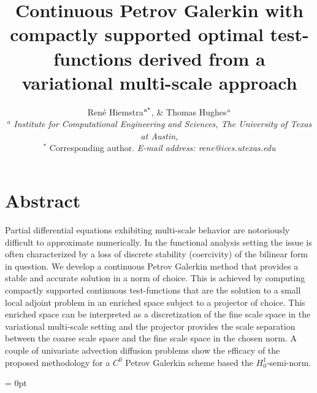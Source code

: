 \documentclass[12pt]{article}
\begin{document}
\title{Continuous Petrov Galerkin with compactly supported optimal test-functions derived from a variational multi-scale approach}

\author{Ren\'{e} Hiemstra$^{\textup{a*}}$, \& Thomas Hughes$^{\textup{a}}$ \\
$^a$ \textit{\small Institute for Computational Engineering and Sciences, The University of Texas at Austin,} \\
$^*$ \small Corresponding author.  \textit{E-mail address: rene@ices.utexas.edu}}

\date{}
\maketitle

\section*{Abstract} Partial differential equations exhibiting multi-scale behavior are notoriously difficult to approximate numerically. In the functional analysis setting the issue is often characterized by a loss of discrete stability (coercivity) of the bilinear form in question. We develop a continuous Petrov Galerkin method that provides a stable and accurate solution in a norm of choice. This is achieved by computing compactly supported continuous test-functions that are the solution to a small local adjoint problem in an enriched space subject to a projector of choice. This enriched space can be interpreted as a discretization of the fine scale space in the variational multi-scale setting and the projector provides the scale separation between the coarse scale space and the fine scale space in the chosen norm. A couple of univariate advection diffusion problems show the efficacy of the proposed methodology for a $C^0$ Petrov Galerkin scheme based the $H^1_0$-semi-norm.
\\


\newpage

\thispagestyle{plain}
\headheight = 0pt

\label{sec:intro}




\end{document}
